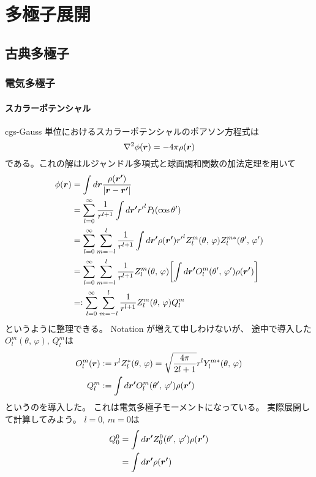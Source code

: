 \documentclass[../../master.tex]{subfiles}
\begin{document}
\chapter{多極子展開}
\section{古典多極子}
\subsection{電気多極子}
\subsubsection*{スカラーポテンシャル}
cgs-Gauss 単位におけるスカラーポテンシャルのポアソン方程式は
\begin{equation}
    \laplacian \phi(\vb*{r}) = -4\pi\rho(\vb*{r})
\end{equation}
である。これの解はルジャンドル多項式と球面調和関数の加法定理を用いて
\begin{align}
    \phi(\vb*{r})
    &= \int d\vb*{r} \frac{\rho(\vb*{r'})}{\abs{\vb*{r}-\vb*{r'}}}\\
    &= \sum_{l=0}^{\infty} \frac{1}{r^{l+1}} \int d\vb*{r'} {r'}^{l} P_l(\cos\theta')\\
    &= \sum_{l=0}^{\infty} \sum_{m=-l}^{l} \frac{1}{r^{l+1}}\int d\vb*{r'} \rho(\vb*{r'}){r'}^l Z_l^m(\theta,\,\varphi) Z_l^{m*} (\theta',\,\varphi')\\
    &= \sum_{l=0}^{\infty} \sum_{m=-l}^{l} \frac{1}{r^{l+1}}Z_l^m(\theta,\,\varphi) \qty[\int d\vb*{r'} O_l^{m} (\theta',\,\varphi')\rho(\vb*{r'})]\\
    &=:\sum_{l=0}^{\infty} \sum_{m=-l}^{l} \frac{1}{r^{l+1}}Z_l^m(\theta,\,\varphi) Q_l^m
\end{align}
というように整理できる。
Notation が増えて申しわけないが、
途中で導入した\(O_l^m(\theta,\,\varphi),\,Q_l^m\)は
\begin{align}
    O_l^m(\vb*{r}) &:= r^l Z_l^{*}(\theta,\,\varphi) = \sqrt{\frac{4\pi}{2l+1}}r^lY_l^{m*}(\theta,\,\varphi)\\
    Q_l^m &:= \int d\vb*{r'} O_l^{m} (\theta',\,\varphi') \rho(\vb*{r'})
\end{align}
というのを導入した。
これは電気多極子モーメントになっている。
実際展開して計算してみよう。
\(l=0,\,m=0\)は
\begin{align}
    Q_0^0
    &= \int d\vb*{r'}  Z_0^0 (\theta',\,\varphi') \rho(\vb*{r'})\\
    &= \int d\vb*{r'} \rho(\vb*{r'})
\end{align}
\end{document}
